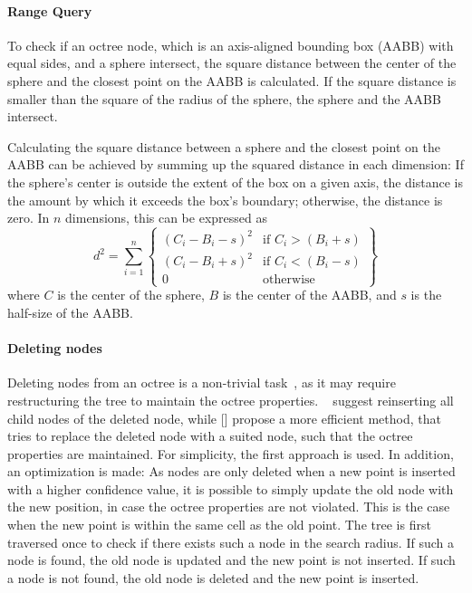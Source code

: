 \paragraph{Range Query}
To check if an octree node, which is an axis-aligned bounding box (AABB) with equal sides, and a sphere intersect,
the square distance between the center of the sphere and the closest point on the AABB is calculated.
If the square distance is smaller than the square of the radius of the sphere, the sphere and the AABB intersect.

Calculating the square distance between a sphere and the closest point on the AABB can be achieved by summing up the
squared distance in each dimension:
If the sphere's center is outside the extent of the box on a given axis,
the distance is the amount by which it exceeds the box's boundary; otherwise, the distance is zero.
In $n$ dimensions, this can be expressed as
\begin{equation}
    d^2 = \sum_{i=1}^{n} \left\{
    \begin{array}{ll}
    (C_i - B_i - s)
        ^2                & \text{if } C_i > (B_i + s) \\
        (C_i - B_i + s)^2 & \text{if } C_i < (B_i - s) \\
        0                 & \text{otherwise}
    \end{array}
    \right\}
\end{equation}
where $C$ is the center of the sphere, $B$ is the center of the AABB, and $s$ is the half-size of the AABB\@.
\parencite{glassner_graphics_1994}

\paragraph{Deleting nodes}
Deleting nodes from an octree is a non-trivial task~\parencite{samet_design_1989, finkel_quad_1974}, as it may require restructuring the tree to maintain the octree properties.
\citeauthor{finkel_quad_1974}~\parencite{finkel_quad_1974} suggest reinserting all child nodes of the deleted node,
while [] propose a more efficient method, that tries to replace the deleted node with a suited node, such that the octree properties are maintained.
For simplicity, the first approach is used.
In addition, an optimization is made:
As nodes are only deleted when a new point is inserted with a higher confidence value,
it is possible to simply update the old node with the new position, in case the octree properties are not violated.
This is the case when the new point is within the same cell as the old point.
The tree is first traversed once to check if there exists such a node in the search radius.
If such a node is found, the old node is updated and the new point is not inserted.
If such a node is not found, the old node is deleted and the new point is inserted.


